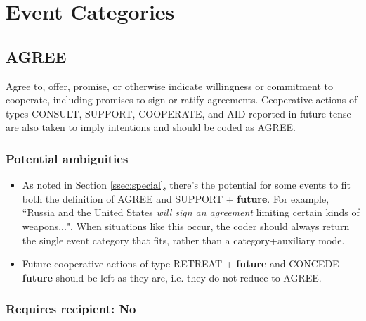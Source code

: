\documentclass[11pt]{report}
\newcommand{\plcat}[1]{\textsf{#1}}
\newcommand{\plcon}[1]{\textbf{#1}}
\begin{document}
\chapter{Event Categories}

\section{AGREE}


Agree to, offer, promise, or otherwise indicate willingness or commitment to cooperate, including promises to sign or ratify agreements.  Ccoperative actions of types \plcat{CONSULT}, \plcat{SUPPORT}, \plcat{COOPERATE}, and \plcat{AID} reported in future tense are also taken to imply intentions and should be coded as \plcat{AGREE}.


\subsection{Potential ambiguities}

\begin{itemize}
\item As noted in Section \ref{ssec:special}, there's the potential for some events to fit both the definition of \plcat{AGREE} and \plcat{SUPPORT} + \plcon{future}. For example, ``Russia and the United States \emph{will sign an agreement} limiting certain kinds of weapons...". When situations like this occur, the coder should always return the single event category that fits, rather than a category+auxiliary mode.
\item Future cooperative actions of type \plcat{RETREAT} + \plcon{future} and \plcat{CONCEDE} + \plcon{future} should be left as they are, i.e. they do not reduce to \plcat{AGREE}.
\end{itemize}

\subsection{Requires recipient: No}
\end{document}
